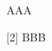 \begin{accomplishments}                                     %
    [1] AAA

    [2] BBB
\end{accomplishments}                                       %
